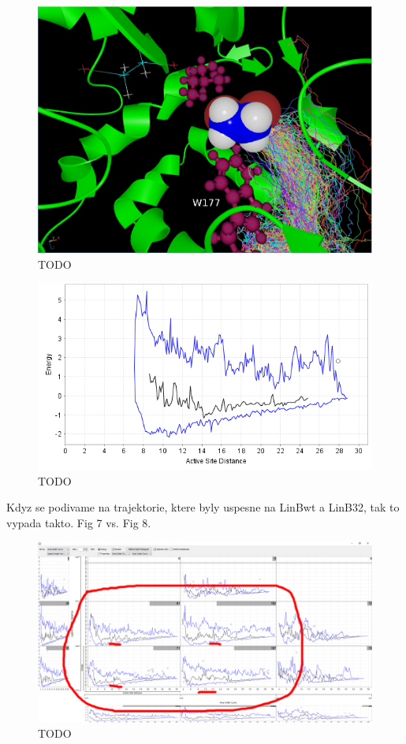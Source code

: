 \documentclass{vgtc}                          %
\begin{document}
\begin{figure}[h]
  \centering
  \includegraphics[width=\columnwidth]{cs01-linb32-sel-failed-3d}
  \caption{TODO}
\end{figure}

\begin{figure}[h]
  \centering
  \includegraphics[width=\columnwidth]{cs01-linb32-sel-failed}
  \caption{TODO}
\end{figure}

Kdyz se podivame na trajektorie, ktere byly uspesne na LinBwt a LinB32, tak to vypada takto. Fig 7 vs. Fig 8.

\begin{figure}[h]
  \centering
  \includegraphics[width=\columnwidth]{cs01-linb32-sel-success}
  \caption{TODO}
\end{figure}
\end{document}
